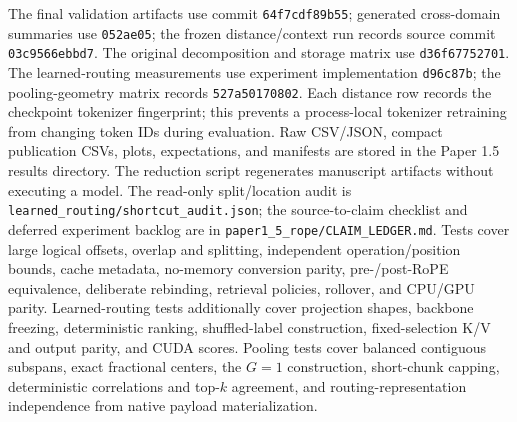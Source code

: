 \documentclass[11pt]{article}
\begin{document}
The final validation artifacts use commit \texttt{64f7cdf89b55}; generated cross-domain
summaries use \texttt{052ae05}; the frozen distance/context run records source commit
\texttt{03c9566ebbd7}. The original decomposition and storage matrix use
\texttt{d36f67752701}. The learned-routing measurements use experiment implementation
\texttt{d96c87b}; the pooling-geometry matrix records \texttt{527a50170802}. Each distance row records the checkpoint tokenizer fingerprint; this
prevents a process-local tokenizer retraining from changing token IDs during evaluation.
Raw CSV/JSON, compact publication CSVs, plots, expectations, and manifests are stored in the
Paper 1.5 results directory. The reduction script regenerates manuscript artifacts without
executing a model. The read-only split/location audit is
\texttt{learned\_routing/shortcut\_audit.json}; the source-to-claim checklist and deferred
experiment backlog are in \texttt{paper1\_5\_rope/CLAIM\_LEDGER.md}. Tests cover large logical offsets, overlap and splitting, independent
operation/position bounds, cache metadata, no-memory conversion parity, pre-/post-RoPE equivalence,
deliberate rebinding, retrieval policies, rollover, and CPU/GPU parity.
Learned-routing tests additionally cover projection shapes, backbone freezing, deterministic
ranking, shuffled-label construction, fixed-selection K/V and output parity, and CUDA scores.
Pooling tests cover balanced contiguous subspans, exact fractional centers, the $G=1$
construction, short-chunk capping, deterministic correlations and top-$k$ agreement, and
routing-representation independence from native payload materialization.

{\small


}
\end{document}

